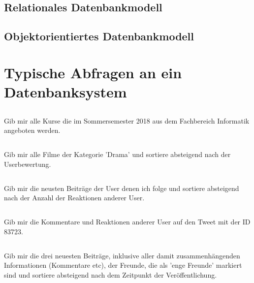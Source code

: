 \subsection{Relationales Datenbankmodell}
\subsection{Objektorientiertes Datenbankmodell}


\section{Typische Abfragen an ein Datenbanksystem}
\subsection{}
Gib mir alle Kurse die im Sommersemester 2018 aus dem Fachbereich Informatik angeboten werden.

\subsection{}
Gib mir alle Filme der Kategorie 'Drama' und sortiere absteigend nach der Userbewertung.

\subsection{}
Gib mir die neusten Beiträge der User denen ich folge und sortiere absteigend nach der Anzahl der Reaktionen anderer User.

\subsection{}
Gib mir die Kommentare und Reaktionen anderer User auf den Tweet mit der ID 83723.

\subsection{}
Gib mir die drei neuesten Beiträge, inklusive aller damit zusammenhängenden Informationen (Kommentare etc), der Freunde, die als 'enge Freunde' markiert sind und sortiere absteigend nach dem Zeitpunkt der Veröffentlichung.

\printbibliography %


